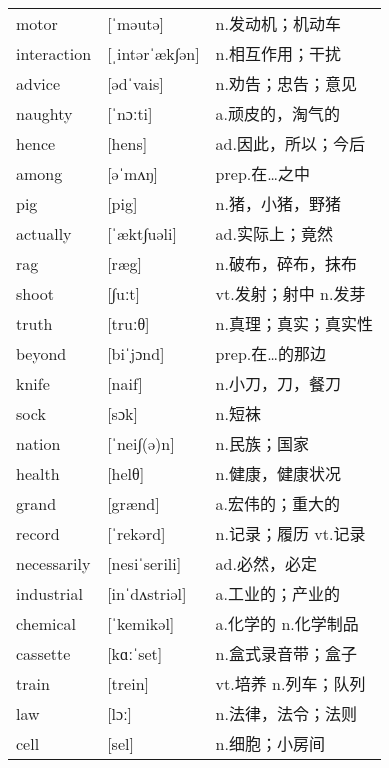 \documentclass[a4paper]{article}
\begin{document}
\section{}
\begin{tabular}{l l l}

motor & [ˈməutə] & n.发动机；机动车 \\
interaction & [ˌintərˈæk∫ən] & n.相互作用；干扰 \\
advice & [ədˈvais] & n.劝告；忠告；意见 \\
naughty & [ˈnɔːti] & a.顽皮的，淘气的 \\
hence & [hens] & ad.因此，所以；今后 \\
among & [əˈmʌŋ] & prep.在…之中 \\
pig & [pig] & n.猪，小猪，野猪 \\
actually & [ˈækt∫uəli] & ad.实际上；竟然 \\
rag & [ræg] & n.破布，碎布，抹布 \\
shoot & [∫uːt] & vt.发射；射中 n.发芽 \\
truth & [truːθ] & n.真理；真实；真实性 \\
beyond & [biˈjɔnd] & prep.在…的那边 \\
knife & [naif] & n.小刀，刀，餐刀 \\
sock & [sɔk] & n.短袜 \\
nation & [ˈnei∫(ə)n] & n.民族；国家 \\
health & [helθ] & n.健康，健康状况 \\
grand & [grænd] & a.宏伟的；重大的 \\
record & [ˈrekərd] & n.记录；履历 vt.记录 \\
necessarily & [nesiˈserili] & ad.必然，必定 \\
industrial & [inˈdʌstriəl] & a.工业的；产业的 \\
chemical & [ˈkemikəl] & a.化学的 n.化学制品 \\
cassette & [kɑːˈset] & n.盒式录音带；盒子 \\
train & [trein] & vt.培养 n.列车；队列 \\
law & [lɔː] & n.法律，法令；法则 \\
cell & [sel] & n.细胞；小房间 \\

\end{tabular}
\end{document}
